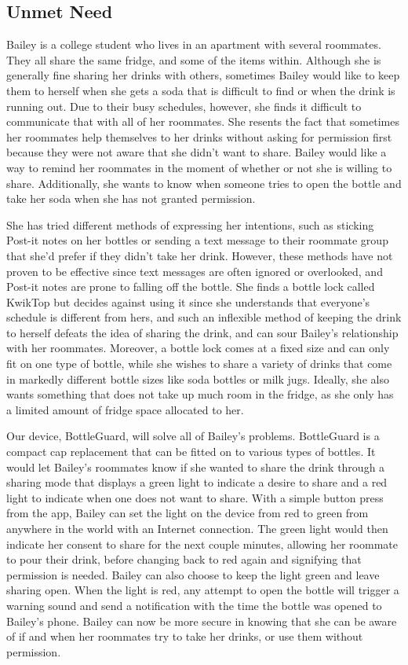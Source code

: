 \documentclass[12pt]{article}
\begin{document}
		\subsection*{Unmet Need}
		Bailey is a college student who lives in an apartment with several roommates. They all share the same fridge, and some of the items within. Although she is generally fine sharing her drinks with others, sometimes Bailey would like to keep them to herself when she gets a soda that is difficult to find or when the drink is running out. Due to their busy schedules, however, she finds it difficult to communicate that with all of her roommates. She resents the fact that sometimes her roommates help themselves to her drinks without asking for permission first because they were not aware that she didn't want to share. Bailey would like a way to remind her roommates in the moment of whether or not she is willing to share. Additionally, she wants to know when someone tries to open the bottle and take her soda when she has not granted permission.
		
		She has tried different methods of expressing her intentions, such as sticking Post-it notes on her bottles or sending a text message to their roommate group that she'd prefer if they didn't take her drink. However, these methods have not proven to be effective since text messages are often ignored or overlooked, and Post-it notes are prone to falling off the bottle. She finds a bottle lock called KwikTop but decides against using it since she understands that everyone’s schedule is different from hers, and such an inflexible method of keeping the drink to herself defeats the idea of sharing the drink, and can sour Bailey’s relationship with her roommates. Moreover, a bottle lock comes at a fixed size and can only fit on one type of bottle, while she wishes to share a variety of drinks that come in markedly different bottle sizes like soda bottles or milk jugs. Ideally, she also wants something that does not take up much room in the fridge, as she only has a limited amount of fridge space allocated to her.
		
		Our device, BottleGuard, will solve all of Bailey’s problems. BottleGuard is a compact cap replacement that can be fitted on to various types of bottles. It would let Bailey’s roommates know if she wanted to share the drink through a sharing mode that displays a green light to indicate a desire to share and a red light to indicate when one does not want to share. With a simple button press from the app, Bailey can set the light on the device from red to green from anywhere in the world with an Internet connection. The green light would then indicate her consent to share for the next couple minutes, allowing her roommate to pour their drink, before changing back to red again and signifying that permission is needed.  Bailey can also choose to keep the light green and leave sharing open. When the light is red, any attempt to open the bottle will trigger a warning sound and send a notification with the time the bottle was opened to Bailey’s phone. Bailey can now be more secure in knowing that she can be aware of if and when her roommates try to take her drinks, or use them without permission.
		
\end{document}
